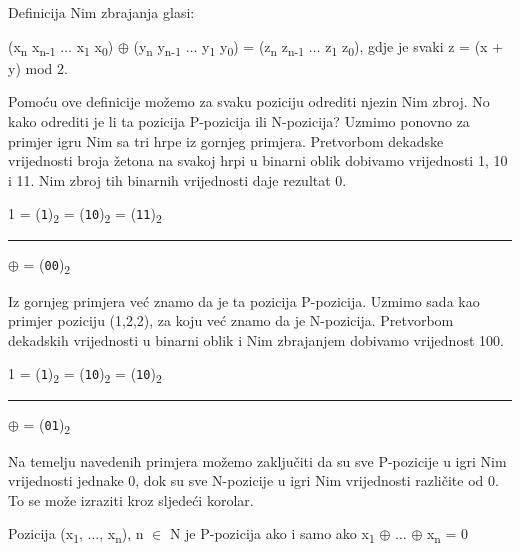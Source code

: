 Definicija Nim zbrajanja glasi:
\begin{definition}
(x\textsubscript{n} x\textsubscript{n-1} $\dots$ x\textsubscript{1} x\textsubscript{0}) $\oplus$ (y\textsubscript{n} y\textsubscript{n-1} $\dots$ y\textsubscript{1} y\textsubscript{0}) = (z\textsubscript{n} z\textsubscript{n-1} $\dots$ z\textsubscript{1} z\textsubscript{0}), gdje je svaki z = (x + y) mod 2.
\end{definition}

Pomoću ove definicije možemo za svaku poziciju odrediti njezin Nim zbroj. No kako odrediti je li ta pozicija P-pozicija ili N-pozicija? Uzmimo ponovno za primjer igru Nim sa tri hrpe iz gornjeg primjera. Pretvorbom dekadske vrijednosti broja žetona na svakoj hrpi u binarni oblik dobivamo vrijednosti 1, 10 i 11.
Nim zbroj tih binarnih vrijednosti daje rezultat 0.

\begin{center}
1 = (\texttt{1})\textsubscript{2} = (\texttt{10})\textsubscript{2} = (\texttt{11})\textsubscript{2}\newline
\rule{2cm}{0.1pt}\newline
$\oplus$ = (\texttt{00})\textsubscript{2}\newline
\end{center}

Iz gornjeg primjera već znamo da je ta pozicija P-pozicija. Uzmimo sada kao primjer poziciju (1,2,2), za koju već znamo da je N-pozicija. Pretvorbom dekadskih vrijednosti u binarni oblik i Nim zbrajanjem dobivamo vrijednost 100.

\begin{center}
1 = (\texttt{1})\textsubscript{2} = (\texttt{10})\textsubscript{2} = (\texttt{10})\textsubscript{2}\newline
\rule{2cm}{0.1pt}\newline
$\oplus$ = (\texttt{01})\textsubscript{2}\newline
\end{center}

Na temelju navedenih primjera možemo zaključiti da su sve P-pozicije u igri Nim vrijednosti jednake 0, dok su sve N-pozicije u igri Nim vrijednosti različite od 0. To se može izraziti kroz sljedeći korolar.

\begin{korolar}\cite{tucker2002appliedcombinatorics}
Pozicija (x\textsubscript{1}, $\dots$, x\textsubscript{n}), n $\in$ N  je P-pozicija ako i samo ako
x\textsubscript{1} $\oplus$ $\dots$ $\oplus$ x\textsubscript{n} = 0
\end{korolar}

